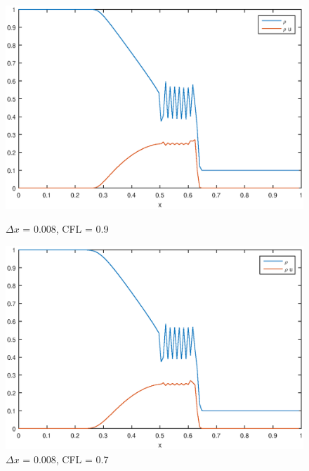 \documentclass[a4paper, 10pt]{article}
\begin{document}
\begin{figure}[!htb]
	\centering
	\begin{minipage}{.5\textwidth}	
		\centering
		\includegraphics[width=1\linewidth]{img/5.eps}
		\caption{$ \Delta x $ = 0.008, CFL = 0.9}
	\end{minipage}%
	\begin{minipage}{.5\textwidth}
		\centering
		\includegraphics[width=1\linewidth]{img/6.eps}
		\caption{$ \Delta x $ = 0.008, CFL = 0.7}
	\end{minipage}
\end{figure}
\end{document}
